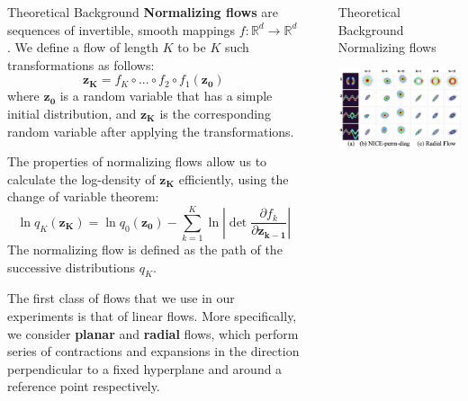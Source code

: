 \documentclass[final,hyperref={pdfpagelabels=false}]{beamer}
\newcommand{\shrink}{-15pt}
\begin{document}
\begin{frame}[t]
\begin{columns}[t]
\begin{column}{.3\textwidth}
    \begin{block}{Theoretical Background}
    \textbf{Normalizing flows} are sequences of invertible, smooth mappings $f:\mathbb{R}^d\rightarrow \mathbb{R}^d$. We define a flow of length $K$ to be $K$ such transformations as follows:
    \[ \mathbf{z_K} = f_K \circ ... \circ f_2 \circ f_1 (\mathbf{z_0}) \] 
    where $\mathbf{z_0}$ is a random variable that has a simple initial distribution, and $\mathbf{z_K}$ is the corresponding random variable after applying the transformations.
    
    The properties of normalizing flows allow us to calculate the log-density of $\mathbf{z_K}$ efficiently, using the change of variable theorem:
    \[ \ln q_K(\mathbf{z_K}) = \ln q_0(\mathbf{z_0}) - \sum_{k=1}^{K} \ln \left| \det \frac{\partial f_k}{\partial \mathbf{z_{k-1}}} \right| \]
    The normalizing flow is defined as the path of the successive distributions $q_K$.
    
    The first class of flows that we use in our experiments is that of linear flows. More specifically, we consider \textbf{planar} and \textbf{radial} flows, which perform series of contractions and expansions in the direction perpendicular to a fixed hyperplane and around a reference point respectively.
          
    \end{block}
  \end{column} %


  \begin{column}{.02\textwidth}\end{column} %

  \begin{column}{.3\textwidth} %
    \vspace{\shrink}
    \begin{block}{Theoretical Background}
      Normalizing flows 
    \end{block}

    
     \begin{center}
	\includegraphics[width=0.9\columnwidth]{EFs-ours}
      \end{center}
      

\end{column}
\end{columns}
\end{frame}
\end{document}
